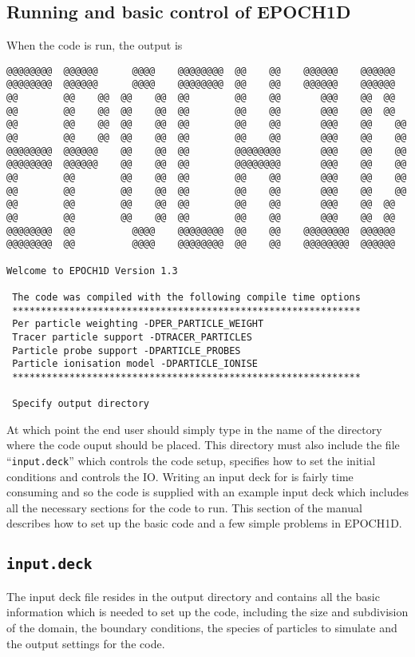 \documentclass[12pt,a4paper]{article}
\newcommand{\boxverbatim}[1]{\begin{Verbatim}[obeytabs=true,frame=single,
  framerule=0.5mm,rulecolor=\color{warwickmid},formatcom=\color{black},label=#1]}
\newcommand{\code}[1]{{\texttt{#1}}}
\newcommand{\qtt}[1]{``{\code{#1}}''}
\newcommand{\EPOCH}{{\color{warwickdark}\fontfamily{phv}\selectfont{EPOCH}}}
\begin{document}
\subsection{Running {\EPOCH} and basic control of EPOCH1D}
When the code is run, the output is\\
\boxverbatim{Command line output}
@@@@@@@@  @@@@@@      @@@@    @@@@@@@@  @@    @@    @@@@@@    @@@@@@
@@@@@@@@  @@@@@@      @@@@    @@@@@@@@  @@    @@    @@@@@@    @@@@@@
@@        @@    @@  @@    @@  @@        @@    @@       @@@    @@  @@
@@        @@    @@  @@    @@  @@        @@    @@       @@@    @@  @@
@@        @@    @@  @@    @@  @@        @@    @@       @@@    @@    @@
@@        @@    @@  @@    @@  @@        @@    @@       @@@    @@    @@
@@@@@@@@  @@@@@@    @@    @@  @@        @@@@@@@@       @@@    @@    @@
@@@@@@@@  @@@@@@    @@    @@  @@        @@@@@@@@       @@@    @@    @@
@@        @@        @@    @@  @@        @@    @@       @@@    @@    @@
@@        @@        @@    @@  @@        @@    @@       @@@    @@    @@
@@        @@        @@    @@  @@        @@    @@       @@@    @@  @@
@@        @@        @@    @@  @@        @@    @@       @@@    @@  @@
@@@@@@@@  @@          @@@@    @@@@@@@@  @@    @@    @@@@@@@@  @@@@@@
@@@@@@@@  @@          @@@@    @@@@@@@@  @@    @@    @@@@@@@@  @@@@@@

Welcome to EPOCH1D Version 1.3

 The code was compiled with the following compile time options
 *************************************************************
 Per particle weighting -DPER_PARTICLE_WEIGHT
 Tracer particle support -DTRACER_PARTICLES
 Particle probe support -DPARTICLE_PROBES
 Particle ionisation model -DPARTICLE_IONISE
 *************************************************************

 Specify output directory
\end{Verbatim}

At which point the end user should simply type in the name of the directory
where the code ouput should be placed. This directory must also include the
file \qtt{input.deck} which controls the code setup, specifies how to set the
initial conditions and controls the IO. Writing an input deck for {\EPOCH} is
fairly time consuming and so the code is supplied with an example input deck
which includes all the necessary sections for the code to run. This section of
the manual describes how to set up the basic code and a few simple problems in
EPOCH1D.

\subsection{\code{input.deck}}
The input deck file resides in the output directory and contains all the basic
information which is needed to set up the code, including the size and
subdivision of the domain, the boundary conditions, the species of particles to
simulate and the output settings for the code.
\end{document}

